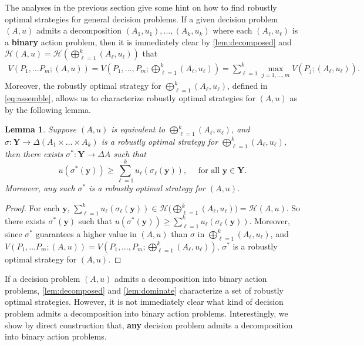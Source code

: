 \documentclass[11pt]{article}
\theoremstyle{plain}
\newtheorem{lem}{Lemma}
\theoremstyle{remark}
\newcommand{\po}{\mathcal{H}}
\begin{document}
The analyses in the previous section give some hint on how to find robustly optimal strategies for general decision problems. If a given decision problem $(A, u)$ admits a decomposition $(A_1, u_1), \ldots , (A_k, u_k)$ where each $(A_\ell,u_\ell)$ is a \textbf{binary} action problem, then it is immediately clear by \autoref{lem:decomposed} and $\po\left( A, u\right) = \po\left(\bigoplus_{\ell =1}^{k}(A_\ell, u_\ell) \right)$ that
\begin{align}
V(P_1, \ldots P_m; (A, u)) = V\left(P_1, \ldots , P_m; \bigoplus_{\ell = 1}^{k} (A_\ell, u_\ell)\right) = \sum_{\ell = 1}^{k} \max_{j = 1, \ldots , m}V(P_j; (A_\ell, u_\ell)). \label{eqn:canonical}
\end{align}
Moreover, the robustly optimal strategy for $\bigoplus_{\ell = 1}^{k} (A_\ell, u_\ell)$, defined in \eqref{eq:assemble}, allows us to characterize robustly optimal strategies for $(A,u)$ as by the following lemma.

\begin{lem}\label{lem:dominate}
Suppose $(A,u)$ is equivalent to $\bigoplus_{\ell = 1}^{k} (A_\ell, u_\ell)$, and $\sigma:\mathbf{Y}\rightarrow \Delta(A_1\times\ldots\times A_k)$ is a robustly optimal strategy for $\bigoplus_{\ell = 1}^{k} (A_\ell, u_\ell)$, then there exists $\sigma^*:\mathbf{Y}\rightarrow \Delta A$ such that
\[u(\sigma^*(\mathbf{y}))\geq \sum_{\ell=1}^k u_\ell(\sigma_\ell(\mathbf{y})),\quad\text{ for all }\mathbf{y} \in \mathbf{Y}.\]
Moreover, any such $\sigma^*$ is a robustly optimal strategy for $(A,u)$.
\end{lem}
\begin{proof}
For each $\mathbf{y}$, $\sum_{\ell=1}^k u_\ell(\sigma_\ell(\mathbf{y}))\in \po\bigg(\bigoplus_{\ell = 1}^{k} (A_\ell, u_\ell)\bigg)=\po(A,u)$. So there exists $\sigma^*(\mathbf{y})$ such that $u(\sigma^*(\mathbf{y}))\geq \sum_{\ell=1}^k u_\ell(\sigma_\ell(\mathbf{y}))$. Moreover, since $\sigma^*$ guarantees a higher value in $(A,u)$ than $\sigma$ in $\bigoplus_{\ell = 1}^{k} (A_\ell, u_\ell)$, and $V(P_1, \ldots P_m; (A, u)) = V\left(P_1, \ldots , P_m; \bigoplus_{\ell = 1}^{k} (A_\ell, u_\ell)\right)$, $\sigma^*$ is a robustly optimal strategy for $(A,u)$.
\end{proof}



If a decision problem $(A, u)$ admits a decomposition into binary action problems, \autoref{lem:decomposed} and \autoref{lem:dominate} characterize a set of robustly optimal strategies. However, it is not immediately clear what kind of decision problem admits a decomposition into binary action problems. Interestingly, we show by direct construction that, \textbf{any}  decision problem admits a decomposition into binary action problems.
\end{document}
